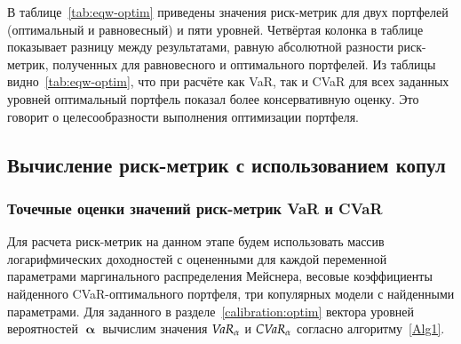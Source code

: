 В таблице~\ref{tab:eqw-optim} приведены значения риск-метрик для двух портфелей (оптимальный и равновесный) и пяти уровней. 
Четвёртая колонка в таблице показывает разницу между результатами, равную абсолютной разности риск-метрик, полученных для равновесного и оптимального портфелей. 
Из таблицы видно~\ref{tab:eqw-optim}, что при расчёте как VaR, так и CVaR для всех заданных уровней оптимальный портфель показал более консервативную оценку.
Это говорит о целесообразности выполнения оптимизации портфеля.

\subsection{Вычисление риск-метрик с использованием копул}
\label{results:risk-measures}


\subsubsection{Точечные оценки значений риск-метрик VaR и CVaR}

Для расчета риск-метрик на данном этапе будем использовать массив логарифмических доходностей с оцененными  для каждой переменной параметрами маргинального распределения Мейснера, весовые коэффициенты найденного CVaR-оптимального портфеля, три копулярных модели с найденными параметрами.
Для заданного в разделе~\ref{calibration:optim} вектора уровней вероятностей $\pmb{\upalpha}$ вычислим значения $\emph{VaR}_\alpha$ и $\emph{CVaR}_\alpha$ согласно алгоритму~\ref{Alg1}.

